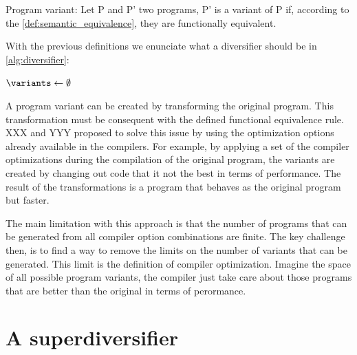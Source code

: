 \begin{definition}{Program variant:}
    \label{def:variant}
    Let P and P' two programs, P' is a variant of P if, according to the \autoref{def:semantic_equivalence}, they are functionally equivalent.
\end{definition}
    

With the previous definitions we enunciate what a diversifier should be in \autoref{alg:diversifier}:


\begin{algorithm}[H]

    $\variants \leftarrow \emptyset$ \;
    
    \caption{Program diversifier}
\label{alg:diversifier}

\end{algorithm}

A program variant can be created by transforming the original program. This transformation must be consequent with the defined functional equivalence rule. 
XXX and YYY proposed to solve this issue by using the optimization options already available in the compilers. For example, by applying a set of the compiler optimizations during the compilation of the original program, the variants are created by changing out code that it not the best in terms of performance. The result of the transformations is a program that behaves as the original program but faster. 

The main limitation with this approach is that the number of programs that can be generated from all compiler option combinations are finite. The key challenge then, is to find a way to remove the limits on the number of variants that can be generated. This limit is the definition of compiler optimization.  Imagine the space of all possible program variants, the compiler just take care about those programs that are better than the original in terms of perormance.


\section{A superdiversifier}


